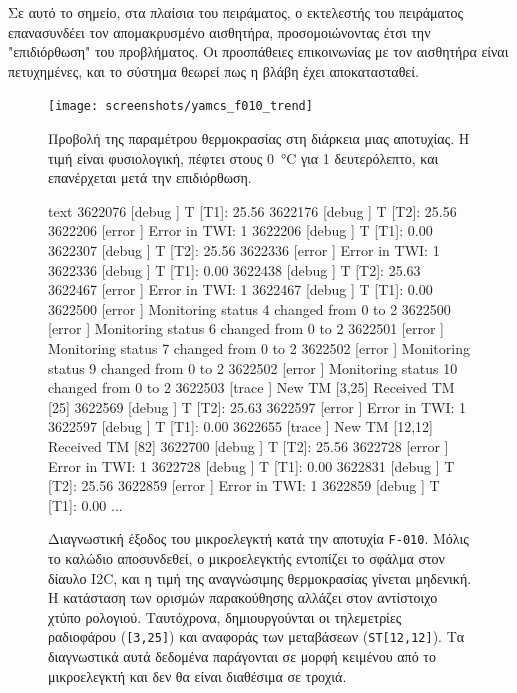 \documentclass[a4paper,nobib]{tufte-book}
\begin{document}
Σε αυτό το σημείο, στα πλαίσια του πειράματος, ο εκτελεστής του πειράματος επανασυνδέει τον απομακρυσμένο αισθητήρα, προσομοιώνοντας έτσι την "επιδιόρθωση" του προβλήματος. Οι προσπάθειες επικοινωνίας με τον αισθητήρα είναι πετυχημένες, και το σύστημα θεωρεί πως η βλάβη έχει αποκατασταθεί.

\begin{figure}[h]
	\centering
	\texttt{[image: screenshots/yamcs\_f010\_trend]}
	\caption[Προβολή της παραμέτρου θερμοκρασίας στη διάρκεια μιας αποτυχίας]{Προβολή της παραμέτρου θερμοκρασίας στη διάρκεια μιας αποτυχίας. Η τιμή είναι φυσιολογική, πέφτει στους \SI{0}{\celsius} για 1 δευτερόλεπτο, και επανέρχεται μετά την επιδιόρθωση.}
	\label{fig:yamcsf010trend}
\end{figure}

\begin{figure}
	\begin{cminted}{text}
3622076 [debug  ] T [T1]: 25.56
3622176 [debug  ] T [T2]: 25.56
3622206 [error  ] Error in TWI: 1
3622206 [debug  ] T [T1]: 0.00
3622307 [debug  ] T [T2]: 25.56
3622336 [error  ] Error in TWI: 1
3622336 [debug  ] T [T1]: 0.00
3622438 [debug  ] T [T2]: 25.63
3622467 [error  ] Error in TWI: 1
3622467 [debug  ] T [T1]: 0.00
3622500 [error  ] Monitoring status 4 changed from 0 to 2
3622500 [error  ] Monitoring status 6 changed from 0 to 2
3622501 [error  ] Monitoring status 7 changed from 0 to 2
3622502 [error  ] Monitoring status 9 changed from 0 to 2
3622502 [error  ] Monitoring status 10 changed from 0 to 2
3622503 [trace  ] New TM [3,25]
Received TM [25]
3622569 [debug  ] T [T2]: 25.63
3622597 [error  ] Error in TWI: 1
3622597 [debug  ] T [T1]: 0.00
3622655 [trace  ] New TM [12,12]
Received TM [82]
3622700 [debug  ] T [T2]: 25.56
3622728 [error  ] Error in TWI: 1
3622728 [debug  ] T [T1]: 0.00
3622831 [debug  ] T [T2]: 25.56
3622859 [error  ] Error in TWI: 1
3622859 [debug  ] T [T1]: 0.00
...
	\end{cminted}
	\caption[Διαγνωστική έξοδος του μικροελεγκτή κατά την αποτυχία \texttt{F-010}]{Διαγνωστική έξοδος του μικροελεγκτή κατά την αποτυχία \texttt{F-010}. Μόλις το καλώδιο αποσυνδεθεί, ο μικροελεγκτής εντοπίζει το σφάλμα στον δίαυλο \acs{I2C}, και η τιμή της αναγνώσιμης θερμοκρασίας γίνεται μηδενική. Η κατάσταση των ορισμών παρακούθησης αλλάζει στον αντίστοιχο χτύπο ρολογιού. Ταυτόχρονα, δημιουργούνται οι τηλεμετρίες ραδιοφάρου (\texttt{[3,25]}) και αναφοράς των μεταβάσεων (\texttt{ST[12,12]}). Τα διαγνωστικά αυτά δεδομένα παράγονται σε μορφή κειμένου από το μικροελεγκτή και δεν θα είναι διαθέσιμα σε τροχιά.}
\end{figure}
\end{document}
